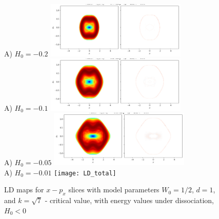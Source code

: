 \documentclass[10pt,aps,onecolumn,superscriptaddress]{revtex4-2}
\begin{document}
\begin{figure}
    \centering
    A) $H_0 = -0.2$ \includegraphics[width=0.6\textwidth]{notebooks/bifurcation/k_critical/LD_total_x-px_tau_500_k_kc_E_-0.4.png}\\
    A) $H_0 = -0.1$ \includegraphics[width=0.6\textwidth]{notebooks/bifurcation/k_critical/LD_total_x-px_tau_500_k_kc_E_-0.2.png}\\
    A) $H_0 = -0.05$ \includegraphics[width=0.6\textwidth]{notebooks/bifurcation/k_critical/LD_total_x-px_tau_500_k_kc_E_-0.1.png}\\
    A) $H_0 = -0.01$ \texttt{[image: LD\_total]}
    \caption{LD maps for $x-p_x$ slices with model parameters $W_0 = 1/2$, $d = 1$, and $k = \sqrt{7}$ - critical value, with energy values under dissociation, $H_0 < 0$}
\end{figure}
\end{document}
